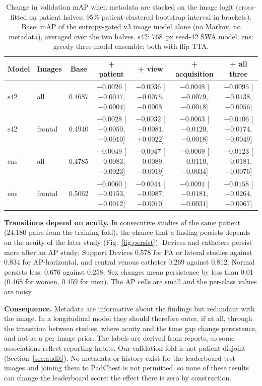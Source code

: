 \documentclass[conference]{IEEEtran}
\begin{document}
\begin{table}[htbp]
\caption{Change in validation mAP when metadata are stacked on the image logit (cross-fitted on patient halves; 95\% patient-clustered bootstrap interval in brackets). Base: mAP of the entropy-gated v3 image model alone (no Markov, no metadata), averaged over the two halves. s42: 768~px seed-42 SWA model; ens: greedy three-model ensemble; both with flip TTA.}
\begin{center}
\footnotesize
\setlength{\tabcolsep}{2.1pt}
\begin{tabular}{|l|l|c|c|c|c|c|}
\hline
\textbf{Model} & \textbf{Images} & \textbf{Base} & \textbf{+ patient} & \textbf{+ view} & \textbf{+ acquisition} & \textbf{+ all three} \\
\hline
s42 & all & 0.4687 & $-0.0026$ [$-0.0047$, $-0.0004$] & $-0.0036$ [$-0.0075$, $-0.0008$] & $-0.0048$ [$-0.0079$, $-0.0018$] & $-0.0095$ [$-0.0138$, $-0.0056$] \\
\hline
s42 & frontal & 0.4940 & $-0.0028$ [$-0.0050$, $-0.0010$] & $-0.0032$ [$-0.0081$, $+0.0022$] & $-0.0063$ [$-0.0120$, $-0.0018$] & $-0.0106$ [$-0.0174$, $-0.0049$] \\
\hline
ens & all & 0.4785 & $-0.0049$ [$-0.0083$, $-0.0023$] & $-0.0047$ [$-0.0089$, $-0.0019$] & $-0.0069$ [$-0.0110$, $-0.0034$] & $-0.0123$ [$-0.0181$, $-0.0076$] \\
\hline
ens & frontal & 0.5062 & $-0.0060$ [$-0.0153$, $-0.0012$] & $-0.0044$ [$-0.0087$, $-0.0010$] & $-0.0091$ [$-0.0181$, $-0.0031$] & $-0.0158$ [$-0.0264$, $-0.0067$] \\
\hline
\end{tabular}
\label{tab:incr}
\end{center}
\end{table}

\textbf{Transitions depend on acuity.} In consecutive studies of the same patient (24,180 pairs from the training fold), the chance that a finding persists depends on the acuity of the later study (Fig.~\ref{fig:persist}). Devices and catheters persist more after an AP study: Support Devices 0.578 for PA or lateral studies against 0.834 for AP-horizontal, and central venous catheter 0.269 against 0.812. Normal persists less: 0.676 against 0.258. Sex changes mean persistence by less than 0.01 (0.468 for women, 0.459 for men). The AP cells are small and the per-class values are noisy.

\textbf{Consequence.} Metadata are informative about the findings but redundant with the image. In a longitudinal model they should therefore enter, if at all, through the transition between studies, where acuity and the time gap change persistence, and not as a per-image prior. The labels are derived from reports, so some associations reflect reporting habits. Our validation fold is not patient-disjoint (Section~\ref{sec:audit}). No metadata or history exist for the leaderboard test images and joining them to PadChest is not permitted, so none of these results can change the leaderboard score: the effect there is zero by construction.
\end{document}
